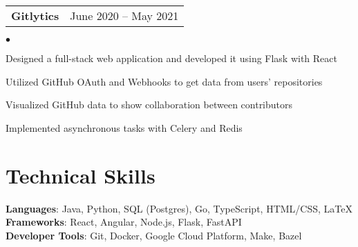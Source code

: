 \documentclass[margin, 11pt]{res}
\makeatletter
\newcommand{\resumeSubSubheading}[2]{
\begin{tabular*}{1.01\textwidth}{@{\hspace{-4pt}}l @{\extracolsep{\fill}} r}
    #1 & #2 
\end{tabular*}\vspace{-7pt}
}
\newenvironment{list2}{
	\begin{list}{$\bullet$}{%
	    \small
		\setlength{\itemsep}{0in}
		\setlength{\parsep}{0in} \setlength{\parskip}{0in}
		\setlength{\topsep}{0in} \setlength{\partopsep}{0in}
		\setlength{\leftmargin}{0.2in}}}{\end{list}}
\makeatother
\begin{document}
\begin{resume}
\resumeSubSubheading{\textbf{Gitlytics}}{June 2020 -- May 2021}

\begin{list2}
\item{Designed a full-stack web application and developed it using Flask with React}
\item{Utilized GitHub OAuth and Webhooks to get data from users' repositories}
\item{Visualized GitHub data to show collaboration between contributors}
\item{Implemented asynchronous tasks with Celery and Redis}
\end{list2}


\section{\sc Technical Skills}

\textbf{Languages}{: Java, Python, SQL (Postgres), Go, TypeScript, HTML/CSS, \LaTeX} \\
\textbf{Frameworks}{: React, Angular, Node.js, Flask, FastAPI} \\
\textbf{Developer Tools}{: Git, Docker, Google Cloud Platform, Make, Bazel} \\


\vspace{0.2in}

\end{resume}
\end{document}
